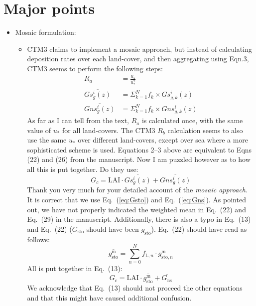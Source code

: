 \section{Major points}
\begin{itemize}
\item {\color{blue} Mosaic formulation:}
  \begin{itemize}
  \item {\color{blue} CTM3 claims to implement a mosaic approach, but instead of calculating deposition
rates over each land-cover, and then aggregating using Eqn.3, CTM3 seems to perform the following steps:
\begin{align}
  \label{eq:ra}
  R_a &= \frac{u_z}{u^2_*}\\
  \label{eq:Gsto}
  \overline{Gs^i_g(z)} &= \Sigma^N_{k=1} f_k \times Gs^i_{g,k}(z)\\
  \label{eq:Gns}
  \overline{Gns^i_g(z)} &= \Sigma^N_{k=1} f_k \times Gns^i_{g,k}(z)
\end{align}
As far as I can tell from the text, $R_a$ is calculated once, with the same value of $u_*$ for all land-covers. The CTM3 $R_b$ calculation seems to also use the same $u_*$ over different land-covers, except over sea where a more sophisticated scheme is used. Equations 2--3 above are equivalent to Eqns (22) and (26) from the manuscript. Now I am puzzled however as to how all this is put together. Do they use:
\begin{equation}
  G_c = \mathrm{LAI} \cdot \overline{Gs^i_g(z)} + \overline{Gns^i_g(z)}
\end{equation}
  }
    Thank you very much for your detailed account of the \emph{mosaic approach}. It is correct that we use Eq.~(\ref{eq:Gsto}) and Eq.~(\ref{eq:Gns}). As pointed out, we have not properly indicated the weighted mean in Eq.~(22) and Eq.~(29) in the manuscript. Additionally, there is also a typo in Eq.~(13) and Eq.~(22) ($G_\mathrm{sto}$ should have been $g_\mathrm{sto}$). Eq.~(22) should have read as follows:
    \begin{equation}
      \overline{g^\mathrm{m}_\text{sto}} = \sum_{n=0}^{N} f_{\text{L}, n}\cdot g^\text{m}_{\text{sto}, n}
    \end{equation}    
    All is put together in Eq.~(13):
    \begin{equation}
      \label{eq:Gsto_corr}
      G_c = \mathrm{LAI} \cdot \overline{g^\mathrm{m}_\mathrm{sto}} + \overline{G_\mathrm{ns}}
    \end{equation}
    We acknowledge that Eq.~(13) should not proceed the other equations and that this might have caused additional confusion. 
    

\end{itemize}
\end{itemize}
